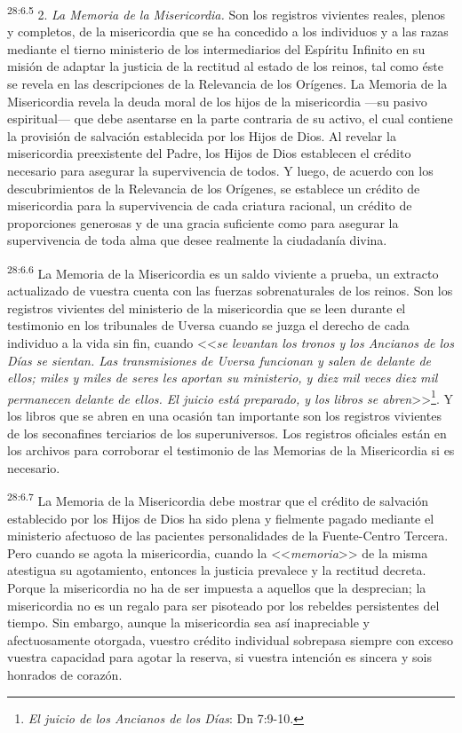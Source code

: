 \par
\textsuperscript{28:6.5} 2. \textit{La Memoria de la Misericordia.} Son los registros vivientes reales, plenos y completos, de la misericordia que se ha concedido a los individuos y a las razas mediante el tierno ministerio de los intermediarios del Espíritu Infinito en su misión de adaptar la justicia de la rectitud al estado de los reinos, tal como éste se revela en las descripciones de la Relevancia de los Orígenes. La Memoria de la Misericordia revela la deuda moral de los hijos de la misericordia ---su pasivo espiritual--- que debe asentarse en la parte contraria de su activo, el cual contiene la provisión de salvación establecida por los Hijos de Dios. Al revelar la misericordia preexistente del Padre, los Hijos de Dios establecen el crédito necesario para asegurar la supervivencia de todos. Y luego, de acuerdo con los descubrimientos de la Relevancia de los Orígenes, se establece un crédito de misericordia para la supervivencia de cada criatura racional, un crédito de proporciones generosas y de una gracia suficiente como para asegurar la supervivencia de toda alma que desee realmente la ciudadanía divina.

\par
\textsuperscript{28:6.6} La Memoria de la Misericordia es un saldo viviente a prueba, un extracto actualizado de vuestra cuenta con las fuerzas sobrenaturales de los reinos. Son los registros vivientes del ministerio de la misericordia que se leen durante el testimonio en los tribunales de Uversa cuando se juzga el derecho de cada individuo a la vida sin fin, cuando <<\textit{se levantan los tronos y los Ancianos de los Días se sientan. Las transmisiones de Uversa funcionan y salen de delante de ellos; miles y miles de seres les aportan su ministerio, y diez mil veces diez mil permanecen delante de ellos. El juicio está preparado, y los libros se abren}>>\footnote{\textit{El juicio de los Ancianos de los Días}: Dn 7:9-10.}. Y los libros que se abren en una ocasión tan importante son los registros vivientes de los seconafines terciarios de los superuniversos. Los registros oficiales están en los archivos para corroborar el testimonio de las Memorias de la Misericordia si es necesario.

\par
\textsuperscript{28:6.7} La Memoria de la Misericordia debe mostrar que el crédito de salvación establecido por los Hijos de Dios ha sido plena y fielmente pagado mediante el ministerio afectuoso de las pacientes personalidades de la Fuente-Centro Tercera. Pero cuando se agota la misericordia, cuando la <<\textit{memoria}>> de la misma atestigua su agotamiento, entonces la justicia prevalece y la rectitud decreta. Porque la misericordia no ha de ser impuesta a aquellos que la desprecian; la misericordia no es un regalo para ser pisoteado por los rebeldes persistentes del tiempo. Sin embargo, aunque la misericordia sea así inapreciable y afectuosamente otorgada, vuestro crédito individual sobrepasa siempre con exceso vuestra capacidad para agotar la reserva, si vuestra intención es sincera y sois honrados de corazón.

